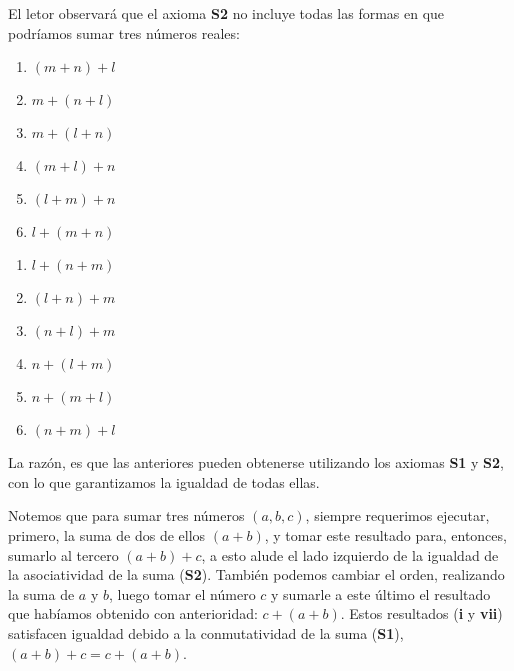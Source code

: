\documentclass[11pt]{article}
\begin{document}
El letor observará que el axioma \textbf{S2} no incluye todas las formas en que podríamos sumar tres números reales:

\begin{adjustbox}{minipage=0.5\linewidth,margin=0pt \smallskipamount,center}
    \noindent\begin{minipage}[c]{.5\linewidth}
    \begin{enumerate}[label=\roman*.]
        \item $(m+n)+l$
        \item $m+(n+l)$
        \item $m+(l+n)$
        \item $(m+l)+n$
        \item $(l+m)+n$
        \item $l+(m+n)$
    \end{enumerate}
    \end{minipage}%
\begin{minipage}[c]{.5\linewidth}
    \begin{enumerate}[start=7,label=\roman*.]
        \item $l+(n+m)$
        \item $(l+n)+m$
        \item $(n+l)+m$
        \item $n+(l+m)$
        \item $n+(m+l)$
        \item $(n+m)+l$
    \end{enumerate}
\end{minipage}
\end{adjustbox}

La razón, es que las anteriores pueden obtenerse utilizando los axiomas \textbf{S1} y \textbf{S2}, con lo que garantizamos la igualdad de todas ellas.

Notemos que para sumar tres números $(a,b,c)$, siempre requerimos ejecutar, primero, la suma de dos de ellos $(a+b)$, y tomar este resultado para, entonces, sumarlo al tercero $(a+b)+c$, a esto alude el lado izquierdo de la igualdad de la asociatividad de la suma (\textbf{S2}). También podemos cambiar el orden, realizando la suma de $a$ y $b$, luego tomar el número $c$ y sumarle a este último el resultado que habíamos obtenido con anterioridad: $c+(a+b)$. Estos resultados (\textbf{i} y \textbf{vii}) satisfacen igualdad debido a la conmutatividad de la suma (\textbf{S1}), $(a+b)+c=c+(a+b)$.
\end{document}
